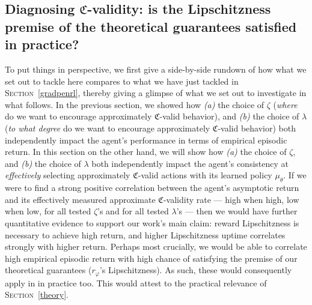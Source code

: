 \subsection[%
Diagnosing $\mathfrak{C}$-validity: is the Lipschitzness premise satisfied in practice?]{%
Diagnosing $\mathfrak{C}$-validity: is the Lipschitzness premise of
the theoretical guarantees satisfied in practice?}
\label{understand}

To put things in perspective,
we first give a side-by-side rundown of how what we set out to tackle here
compares to what we have just tackled in \textsc{Section}~\ref{gradpenrl},
thereby giving a glimpse of what we set out to investigate in what follows.
In the previous section, we showed how \textit{(a)} the choice of $\zeta$
(\emph{where} do we want to encourage approximately $\mathfrak{C}$-valid behavior), and
\textit{(b)} the choice of $\lambda$
(\emph{to what degree} do we want to encourage approximately $\mathfrak{C}$-valid behavior)
both independently impact the agent's performance in terms of empirical episodic return.
In this section on the other hand,
we will show how \textit{(a)} the choice of $\zeta$, and
\textit{(b)} the choice of $\lambda$
both independently impact the agent's consistency at \emph{effectively} selecting
approximately $\mathfrak{C}$-valid actions with its learned policy $\mu_\theta$.
If we were to find a strong positive correlation between the agent's asymptotic return and
its effectively measured approximate $\mathfrak{C}$-validity rate
--- high when high, low when low, for all tested $\zeta$'s and for all tested $\lambda$'s ---
then we would have further quantitative evidence to support our work's main claim:
reward Lipschitzness is necessary to achieve high return, and higher Lipschitzness uptime correlates strongly with
higher return.
Perhaps most crucially,
we would be able to correlate high empirical episodic return with high chance of satisfying the premise of our
theoretical guarantees ($r_\varphi$'s Lipschitzness). As such, these would consequently apply in in practice too.
This would attest to the practical relevance of \textsc{Section}~\ref{theory}.


